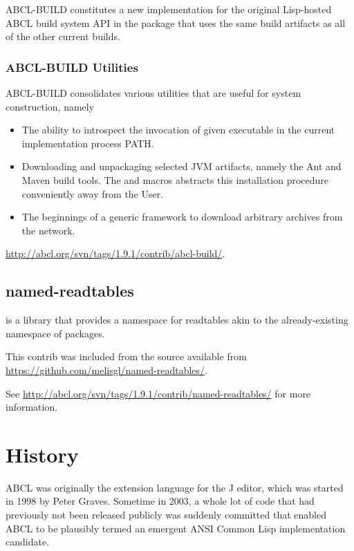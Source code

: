 \documentclass[10pt]{book}
\begin{document}
\textsc{ABCL-BUILD} constitutes a new implementation for the original
Lisp-hosted \textsc{ABCL} build system API in the package
 that uses the same build artifacts as all of the
other current builds.

\subsection{ABCL-BUILD Utilities}

\textsc{ABCL-BUILD} consolidates various utilities that are useful
for system construction, namely

\begin{itemize}

\item The ability to introspect the invocation of given executable in
  the current implementation process PATH.

\item Downloading and unpackaging selected JVM artifacts, namely the
  Ant and Maven build tools.  The  and
   macros abstracts this installation
  procedure conveniently away from the User.

\item The beginnings of a generic framework to download arbitrary
    archives from the network.
\end{itemize}

\url{http://abcl.org/svn/tags/1.9.1/contrib/abcl-build/}.

\section{named-readtables}
\label{section:named-readtables}

 is a library that provides a namespace for
readtables akin to the already-existing namespace of packages.

This contrib was included from the source available from
\url{https://github.com/melisgl/named-readtables/}.

See \url{http://abcl.org/svn/tags/1.9.1/contrib/named-readtables/} for
more information.

\chapter{History}

\textsc{ABCL} was originally the extension language for the J editor, which was
started in 1998 by Peter Graves.  Sometime in 2003, a whole lot of
code that had previously not been released publicly was suddenly
committed that enabled ABCL to be plausibly termed an emergent ANSI
Common Lisp implementation candidate.
\end{document}

